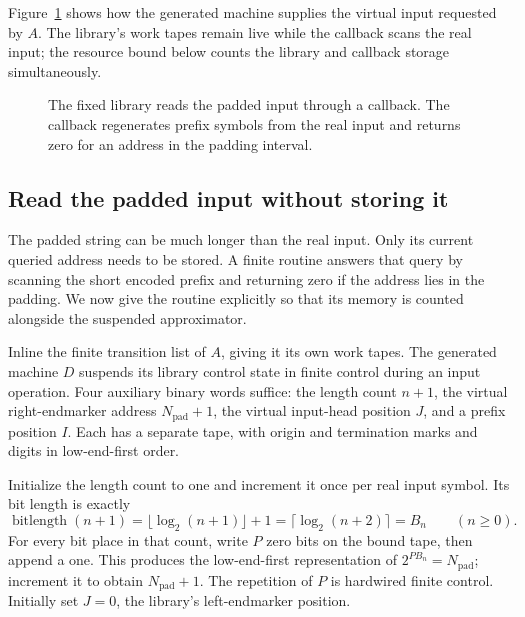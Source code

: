 Figure~\ref{fig:compiler-padding} shows how the generated machine supplies
the virtual input requested by $A$. The library's work tapes remain live
while the callback scans the real input; the resource bound below counts
the library and callback storage simultaneously.

\begin{figure}[tb]
 \centering
 
 \caption{The fixed library reads the padded input through a callback.
 The callback regenerates prefix symbols from the real input and returns
 zero for an address in the padding interval.}
 \label{fig:compiler-padding}
\end{figure}

\subsection{Read the padded input without storing it}
\label{subsec:compiler-callback}

The padded string can be much longer than the real input. Only its current queried address needs to be stored. A finite routine answers that query by scanning the short encoded prefix and returning zero if the address lies in the padding. We now give the routine explicitly so that its memory is counted alongside the suspended approximator.

Inline the finite transition list of $A$, giving it its own work tapes.
The generated machine $D$ suspends its library control state in finite
control during an input operation.  Four auxiliary binary words suffice:
the length count $n+1$, the virtual right-endmarker address
$N_{\mathrm{pad}}+1$, the virtual input-head position $J$, and a prefix
position $I$.  Each has a separate tape, with origin and termination
marks and digits in low-end-first order.

Initialize the length count to one and increment it once per real input
symbol.  Its bit length is exactly
\begin{equation}\label{eq:compiler-bitlength}
 \operatorname{bitlength}(n+1)
   =\lfloor\log_2(n+1)\rfloor+1
   =\lceil\log_2(n+2)\rceil=B_n
 \qquad(n\ge0).
\end{equation}
For every bit place in that count, write $P$ zero bits on the bound tape,
then append a one.  This produces the low-end-first representation of
$2^{PB_n}=N_{\mathrm{pad}}$; increment it to obtain
$N_{\mathrm{pad}}+1$.  The repetition of $P$ is hardwired finite control.
Initially set $J=0$, the library's left-endmarker position.

